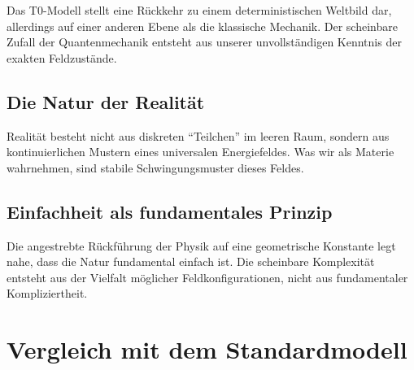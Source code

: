 	Das T0-Modell stellt eine Rückkehr zu einem deterministischen Weltbild dar, allerdings auf einer anderen Ebene als die klassische Mechanik. Der scheinbare Zufall der Quantenmechanik entsteht aus unserer unvollständigen Kenntnis der exakten Feldzustände.
	
	\subsection{Die Natur der Realität}
	
	\begin{important}
		Realität besteht nicht aus diskreten ``Teilchen'' im leeren Raum, sondern aus kontinuierlichen Mustern eines universalen Energiefeldes. Was wir als Materie wahrnehmen, sind stabile Schwingungsmuster dieses Feldes.
	\end{important}
	
	\subsection{Einfachheit als fundamentales Prinzip}
	
	Die angestrebte Rückführung der Physik auf eine geometrische Konstante legt nahe, dass die Natur fundamental einfach ist. Die scheinbare Komplexität entsteht aus der Vielfalt möglicher Feldkonfigurationen, nicht aus fundamentaler Kompliziertheit.
	
	\section{Vergleich mit dem Standardmodell}
	
	\begin{table}[H]
		\centering
		\caption{Vergleich zwischen Standardmodell und T0-Modell}
	\end{table}
	
